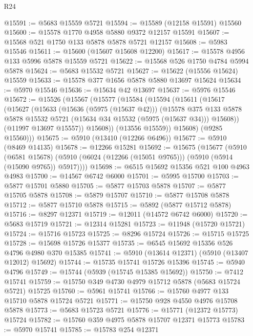 \begin{lexlean}{R24}
\begin{coremodule}
@15591 := @5683 @15559 @5721
@15594 := @15589 (@12158 @15591) @15560
@15600 := @15578 @1770 @4958 @5880 @9372 @12157 @15591
@15607 := @15568 @521 @1750 @133 @5878 @5878 @5721 @12157
@15608 := @5983 @15546
@15611 := @15600 (@15607 @15608 @12200)
@15617 := @15578 @4956 @133 @5996 @5878 @15559 @5721
@15622 := @15568 @526 @1750 @4784 @5994 @5878
@15624 := @5683 @15532 @5721
@15627 := @15622 (@15556 @15624) @15559
@15633 := @15578 @377 @1656 @5878 @5880 @13697 @15624
@15634 := @5970 @15546
@15636 := @15634 @42 @13697
@15637 := @5976 @15546
@15672 := @15526
    (@15567
      (@15577
        (@15584
          (@15594
            (@15611
              (@15617
                (@15627
                  (@15633
                    (@15636 (@5975 (@15637 @42)))
                    (@15578
                      @375
                      @133
                      @5878
                      @5878
                      @15532
                      @5721
                      (@15634 @34 @15532 (@5975 (@15637 @34)))
                      @15608))
                  (@11997 @13697 @15557))
                @15608))
            (@13556 @15559))
          @15608)
        (@9285 @15560)))
@15675 := @5910 (@13410 (@12266 @6496))
@15677 := @5910 (@8469 @14135)
@15678 := @12266 @15281
@15692 := @15675
    (@15677
      (@5910
        (@6581 @15678)
        (@5910 (@6024 (@12266 (@15051 @9765))) (@5910 (@5914 (@15090 @9765)) @5917))))
@15698 := @6515 @15692 @15356 @521 @100 @4963 @4983
@15700 := @14567 @6742 @6000
@15701 := @5995 @15700
@15703 := @5877 @15701 @5880
@15705 := @5877 @15703 @5878
@15707 := @5877 @15705 @5878
@15708 := @5879 @15707
@15710 := @5877 @15708 @5878
@15712 := @5877 @15710 @5878
@15715 := @5892 (@5877 @15712 @5878)
@15716 := @8297 @12371
@15719 := @12011 (@14572 @6742 @6000)
@15720 := @5683 @15719
@15721 := @12314 @15281
@15723 := @11948 (@15720 @15721)
@15724 := @15716 @15723
@15725 := @8296 @15724
@15726 := @15715 @15725
@15728 := @15698 @15726 @15377
@15735 := @6545 @15692 @15356 @526 @4796 @4980 @370 @15385
@15741 := @5910 (@13614 @12371) (@5910 (@13407 @12012) @15692)
@15744 := @15735 @15741 @15726 @15396
@15745 := @5940 @4796
@15749 := @15744 (@5939 (@15745 @15385 @15692))
@15750 := @7412 @15741
@15759 := @15750 @349 @4730 @4979 @15712 @5878 (@5683 @15724 @5721) @15725
@15760 := @5961 @15741
@15766 := @15760 @4977 @133 @15710 @5878 @15724 @5721
@15771 := @15750 @928 @4550 @4976 @15708 @5878
@15773 := @5683 @15723 @5721
@15776 := @15771 (@12372 @15773) @15724
@15782 := @15760 @359 @4975 @5878 @15707 @12371 @15773
@15783 := @5970 @15741
@15785 := @15783 @254 @12371

\end{coremodule}
\end{lexlean}
